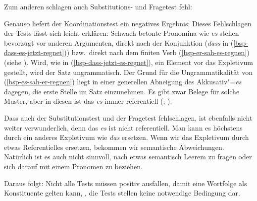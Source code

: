 \documentclass[ number=45
			   ,series=eotms
			   ,printondemand
			  ]{langsci}
\newcommand{\page}{S.\,}
\let\citew=\citealp
\begin{document}
{Zum anderen schlagen auch Substitutions- und Fragetest fehl:
\eal
{}
\zl

\noindent
Genauso liefert der Koordinationstest ein negatives Ergebnis:
\z
Dieses Fehlschlagen der Tests lässt sich leicht erklären: Schwach betonte
Pronomina wie \emph{es} stehen bevorzugt vor anderen Argumenten, direkt nach
der Konjunktion (\emph{dass} in (\ref{bsp-dass-es-jetzt-regnet})) bzw.\
direkt nach dem finiten Verb (\ref{bsp-er-sah-es-regnen}) (siehe \citew[\page 570]{Abraham95a-u}). Wird, wie
in (\ref{bsp-dass-jetzt-es-regnet}), ein Element vor das Expletivum gestellt,
wird der Satz ungrammatisch. Der Grund für die Ungrammatikalität von
(\ref{bsp-es-sah-er-regnen}) liegt in einer generellen Abneigung des 
Akkusativ"=\emph{es} dagegen, die erste Stelle im Satz einzunehmen. Es gibt zwar Belege für
solche Muster, aber in diesen ist das \emph{es} immer referentiell (\citealt[\page162]{Lenerz94a};
\citealp[\page4]{GS97a}).

%
Dass auch der Substitutionstest und der Fragetest fehlschlagen, ist ebenfalls
nicht weiter verwunderlich, denn das \emph{es} ist nicht referentiell.
Man kann es höchstens durch ein anderes Expletivum wie \emph{das} ersetzen.
Wenn wir das Expletivum durch etwas Referentielles ersetzen, bekommen wir semantische Abweichungen.
Natürlich ist es auch nicht sinnvoll, nach etwas semantisch Leerem zu fragen oder
sich darauf mit einem Pronomen zu beziehen.


Daraus folgt: Nicht alle Tests müssen positiv ausfallen, damit eine Wortfolge als Konstituente gelten kann,
\dash, die Tests stellen keine notwendige Bedingung dar.




}
\end{document}
